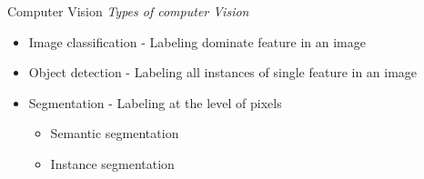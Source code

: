 \documentclass[10pt]{beamer}
\begin{document}
\begin{frame}{Computer Vision}
\emph{Types of computer Vision}
    \begin{itemize}
    	\item Image classification - Labeling dominate feature in an image
    	\item Object detection - Labeling all instances of single feature in an image
    	\item Segmentation - Labeling at the level of pixels
    		\begin{itemize}
    			\item Semantic segmentation
    			\item Instance segmentation
    		\end{itemize}
    \end{itemize}
\end{frame}
\end{document}
